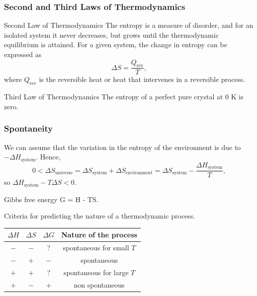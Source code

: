 \documentclass{beamer}
\begin{document}

\begin{frame}
\frametitle{Second and Third Laws of Thermodynamics}
\begin{block}{Second Law of Thermodynamics}
The entropy is a measure of disorder, and for an isolated system it never decreases, but grows until the thermodynamic equilibrium is attained. For a given system, the change in entropy can be expressed as
\begin{equation*}
\Delta S = \frac{Q_{\text{rev}}}{T},
\end{equation*}
where $Q_{\text{rev}}$ is the reversible heat or heat that intervenes in a reversible process.
\end{block}
\begin{block}{Third Law of Thermodynamics}
The entropy of a perfect pure crystal at 0 K is zero.
\end{block}
\end{frame}


\begin{frame}
\frametitle{Spontaneity} 
We can assume that the variation in the entropy of the environment is due to $-\Delta H_{\text{system}}$. Hence,
\begin{equation*}
0<\Delta S_{\text{universe}} = \Delta S_{\text{system}} + \Delta S_{\text{environment}}=\Delta S_{\text{system}}-\frac{\Delta H_{\text{system}}}{T},
\end{equation*}
so $\Delta H_{\text{system}} - T\Delta S < 0$.
\begin{block}{Gibbs free energy}
G = H - TS.
\end{block}
\begin{block}{Criteria for predicting the nature of a thermodynamic process.}
\begin{table}[h]
\begin{center}
\begin{tabular}{cccc}
   $\Delta H$ & $\Delta S$ & $\Delta G$ & Nature of the process  \\ \hline
   $-$ & $-$ & ? & spontaneous for small $T$\\
   $-$ & $+$ & $-$ & spontaneous\\
   $+$ & $+$ & ? & spontaneous for large $T$\\
   $+$ & $-$ & $+$ & non spontaneous\\
\end{tabular}
\end{center}
\end{table}
\end{block}
\end{frame}
\end{document}
